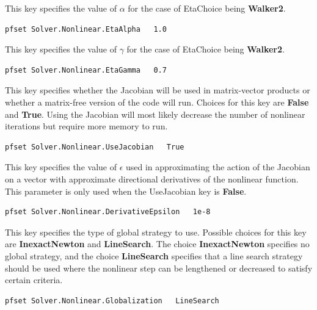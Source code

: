 {This key specifies the value of $\alpha$ for the case of EtaChoice being
{\bf Walker2}.
}
\begin{display}\begin{verbatim}
pfset Solver.Nonlinear.EtaAlpha   1.0
\end{verbatim}\end{display}

{This key specifies the value of $\gamma$ for the case of EtaChoice being
{\bf Walker2}.
}
\begin{display}\begin{verbatim}
pfset Solver.Nonlinear.EtaGamma   0.7
\end{verbatim}\end{display}

{This key specifies whether the Jacobian will be used in matrix-vector products
or whether a matrix-free version of the code will run.  Choices for this key
are {\bf False} and {\bf True}.
Using the Jacobian will most likely decrease the number of nonlinear iterations
but require more memory to run.
}
\begin{display}\begin{verbatim}
pfset Solver.Nonlinear.UseJacobian   True
\end{verbatim}\end{display}

{This key specifies the value of $\epsilon$ used in approximating the action of
the Jacobian on a vector with approximate directional derivatives of the
nonlinear function.  This parameter is only used when the UseJacobian key is
{\bf False}.
}
\begin{display}\begin{verbatim}
pfset Solver.Nonlinear.DerivativeEpsilon   1e-8
\end{verbatim}\end{display}

{This key specifies the type of global strategy to use.  Possible choices for
this key are {\bf InexactNewton} and {\bf LineSearch}.  The choice {\bf
InexactNewton} specifies no global strategy, and the choice {\bf LineSearch}
specifies that a line search strategy should be used where the nonlinear step
can be lengthened or decreased to satisfy certain criteria.
}
\begin{display}\begin{verbatim}
pfset Solver.Nonlinear.Globalization   LineSearch
\end{verbatim}\end{display}

